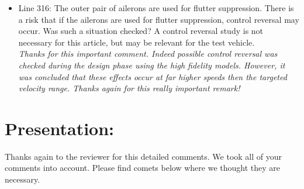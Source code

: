 \documentclass{article}
\begin{document}
\begin{itemize}
	

	\item Line 316: The outer pair of ailerons are used for flutter suppression.  There is a risk that if the ailerons are used for flutter suppression, control reversal may occur.  Was such a situation checked?  A control reversal study is not necessary for this article, but may be relevant for the test vehicle.\\
	\textit{Thanks for this important comment. Indeed possible control reversal was checked during the design phase using the high fidelity models. However, it was concluded that these effects occur at far higher speeds then the targeted velocity range. Thanks again for this really important remark!}\\
\end{itemize}




\section{Presentation:}
Thanks again to the reviewer for this detailed comments. We took all of your comments into account. Please find comets below where we thought they are necessary.
\end{document}
